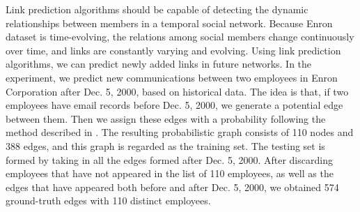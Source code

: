\documentclass[\main/thesis.tex]{subfiles}
\begin{document}
Link prediction algorithms should be capable of detecting the dynamic relationships between members in a temporal social network. Because Enron dataset is time-evolving, the relations among social members change continuously over time, and links are constantly varying and evolving. Using link prediction algorithms, we can predict newly added links in future networks. In the experiment, we predict new communications between two employees in Enron Corporation after Dec. 5, 2000, based on historical data. The idea is that, if two employees have email records before Dec. 5, 2000, we generate a potential edge between them. Then we assign these edges with a probability following the method described in  \cite{shetty2004enron}. The resulting probabilistic graph consists of 110 nodes and 388 edges, and this graph is regarded as the training set. The testing set is formed by taking in all the edges formed after Dec. 5, 2000. After discarding employees that have not appeared in the list of 110 employees, as well as the edges that have appeared both before and after Dec. 5, 2000, we obtained 574 ground-truth edges with 110 distinct employees.
\end{document}
